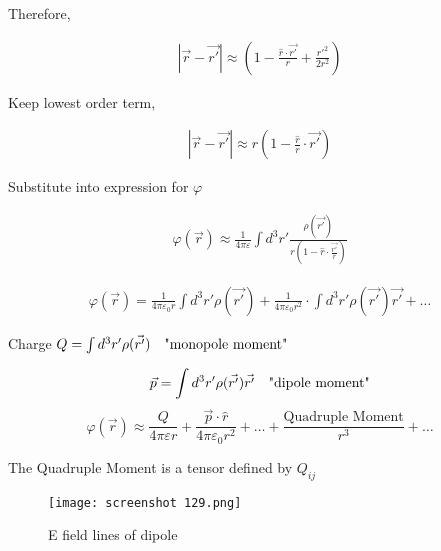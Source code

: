 \documentclass[svgnames]{article}   	%
\begin{document}
Therefore, 

\begin{align*}
  |\vec{r} - \vec{r'}| \approx \left( 1 - \frac{\hat{r} \cdot \vec{r'}}{r}
    + \frac{r'^2}{2r^2} \right)
\end{align*}

Keep lowest order term, 

\begin{align*}
  |\vec{r} - \vec{r'}| \approx r\left(1 - \frac{ \hat{r}}{r} \cdot \vec{r'}
    \right)
\end{align*}

Substitute into expression for $\varphi$
\begin{comment}
\begin{align*}
  \varphi(\vec{r}) &= \frac{1}{4\pi\varepsilon_0} \int d^3 r'
  \frac{\rho(\vec{r'})}{r\left(1 - \hat{r} \cdot \frac{\vec{r'}}{r}} \\
                   &= \frac{1}{4\pi\varepsilon_0r} \int d^3 r' \rho(\vec{r'})
                 \left(1 + \hat{r} \cdot \frac{\vec{r'}}{r}\right) 
\end{align*}
\end{comment}

\begin{align*}
  \varphi(\vec{r}) \approx \frac{1}{4\pi\varepsilon} \int d^3r'
  \frac{\rho(\vec{r'})}{r \left(1 - \hat{r} \cdot \frac{\vec{r'}}{r}\right)} 
\end{align*}


\begin{align*}
  \varphi(\vec{r}) = \frac{1}{4\pi\varepsilon_0r} \int d^3r' \rho(\vec{r'})
  + \frac{1}{4\pi\varepsilon_0r^2} \cdot \int d^3r' \rho(\vec{r'}) \vec{r'}
  + \dots
\end{align*}




Charge $Q = \int d^3 r' \rho(\vec{r'}) \hspace{10px} \text{"monopole moment"}$

\[
  \vec{p} = \int d^3 r' \rho(\vec{r'}) \vec{r'} \hspace{10px} \text{"dipole
  moment"}
\]
\[
  \varphi(\vec{r}) \approx \frac{Q}{4\pi\varepsilon r} + \frac{\vec{p} \cdot
  \hat{r}}{4\pi\varepsilon_0 r^2} + \dots +  \frac{\text{Quadruple
Moment}}{r^3} + \dots
\]

The Quadruple Moment is a tensor defined by $Q_{ij}$


\begin{figure}[H]
  \centering
    \texttt{[image: screenshot 129.png]}
    \caption{E field lines of dipole}
\end{figure}
\end{document}
